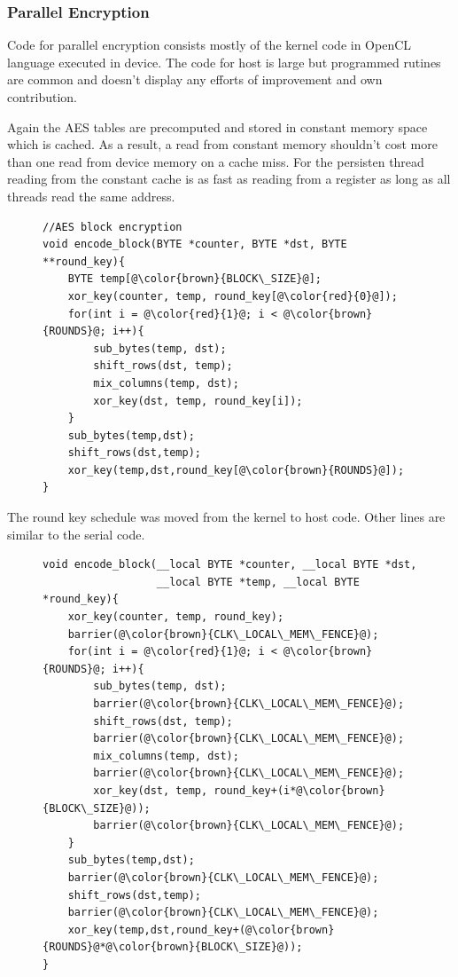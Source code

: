 \subsubsection*{Parallel Encryption}
Code for parallel encryption consists mostly of the kernel code in OpenCL 
language executed in device. The code for host is large but programmed rutines are
common and doesn't display any efforts of improvement and own contribution.

Again the AES tables are precomputed and stored in constant memory space which 
is cached. As a result, a read from constant memory shouldn't cost more than one
read from device memory on a cache miss. For the persisten thread reading from 
the constant cache is as fast as reading from a register as long as all threads 
read the same address.


\begin{figure}[H]
\begin{lstlisting}
//AES block encryption
void encode_block(BYTE *counter, BYTE *dst, BYTE **round_key){
    BYTE temp[@\color{brown}{BLOCK\_SIZE}@];
    xor_key(counter, temp, round_key[@\color{red}{0}@]);
    for(int i = @\color{red}{1}@; i < @\color{brown}{ROUNDS}@; i++){
        sub_bytes(temp, dst);
        shift_rows(dst, temp);
        mix_columns(temp, dst);
        xor_key(dst, temp, round_key[i]);
    }
    sub_bytes(temp,dst);
    shift_rows(dst,temp);
    xor_key(temp,dst,round_key[@\color{brown}{ROUNDS}@]);
}
\end{lstlisting}
\end{figure}

The round key schedule was moved from the kernel to host code. Other lines are
similar to the serial code.

\begin{figure}[H]
\begin{lstlisting}
void encode_block(__local BYTE *counter, __local BYTE *dst, 
                  __local BYTE *temp, __local BYTE *round_key){
    xor_key(counter, temp, round_key);
    barrier(@\color{brown}{CLK\_LOCAL\_MEM\_FENCE}@); 
    for(int i = @\color{red}{1}@; i < @\color{brown}{ROUNDS}@; i++){
        sub_bytes(temp, dst);
        barrier(@\color{brown}{CLK\_LOCAL\_MEM\_FENCE}@);
        shift_rows(dst, temp);
        barrier(@\color{brown}{CLK\_LOCAL\_MEM\_FENCE}@);
        mix_columns(temp, dst);
        barrier(@\color{brown}{CLK\_LOCAL\_MEM\_FENCE}@);
        xor_key(dst, temp, round_key+(i*@\color{brown}{BLOCK\_SIZE}@));
        barrier(@\color{brown}{CLK\_LOCAL\_MEM\_FENCE}@);
    }
    sub_bytes(temp,dst);
    barrier(@\color{brown}{CLK\_LOCAL\_MEM\_FENCE}@);
    shift_rows(dst,temp);
    barrier(@\color{brown}{CLK\_LOCAL\_MEM\_FENCE}@);
    xor_key(temp,dst,round_key+(@\color{brown}{ROUNDS}@*@\color{brown}{BLOCK\_SIZE}@));
}
\end{lstlisting}
\end{figure}

